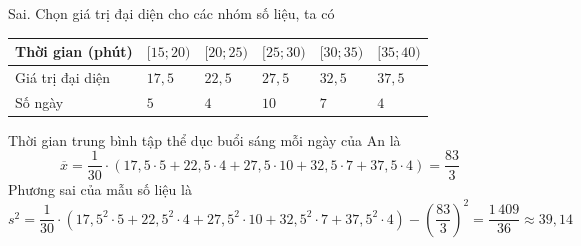 \begin{ex}
{\begin{itemchoice}
\begin{itemize}
			\end{itemize}
			\itemch Sai. Chọn giá trị đại diện cho các  nhóm số liệu, ta có
			\begin{center}
				\begin{tabular}{|>{\raggedright\arraybackslash}m{3.25cm}|>{\centering\arraybackslash}m{1.5cm}|>{\centering\arraybackslash}m{1.5cm}|>{\centering\arraybackslash}m{1.5cm}|>{\centering\arraybackslash}m{1.5cm}|>{\centering\arraybackslash}m{1.5cm}|}
					 \hline
					Thời gian (phút) & $[15;20)$ & $[20;25)$  & $[25;30)$ & $[30;35)$ & $[35;40)$ \\
					 \hline
					Giá trị đại diện & $17{,}5$ & $22{,}5$ & $27{,}5$  & $32{,}5$ & $37{,}5$\\
					\hline 
					Số ngày & $5$ & $4$ &  $10$ & $7$ & $4$ \\
					\hline 
				\end{tabular}
			\end{center}
			Thời gian trung bình tập thể dục buổi sáng mỗi  ngày của An là
			$$\overline{x}=\dfrac{1}{30}\cdot(17{,}5\cdot5+22{,}5\cdot4+27{,}5\cdot10+32{,}5\cdot7+37{,}5\cdot4)=\dfrac{83}{3}$$ 
			Phương sai của mẫu  số liệu là
			 $$s^2=\dfrac{1}{30}\cdot(17{,}5^2\cdot5+22{,}5^2\cdot4+27{,}5^2\cdot10+32{,}5^2\cdot7+37{,}5^2\cdot4)-\left(\dfrac{83}{3}\right)^2=\dfrac{1\,409}{36}\approx39{,}14$$
		\end{itemchoice}
	} 
\end{ex}



